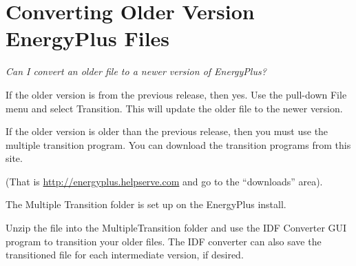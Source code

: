 \section{Converting Older Version EnergyPlus Files}\label{converting-older-version-energyplus-files}

\emph{Can I convert an older file to a newer version of EnergyPlus?}

If the older version is from the previous release, then yes. Use the pull-down File menu and select Transition. This will update the older file to the newer version.

If the older version is older than the previous release, then you must use the multiple transition program. You can download the transition programs from this site.

(That is \url{http://energyplus.helpserve.com} and go to the ``downloads'' area).

The Multiple Transition folder is set up on the EnergyPlus install.

Unzip the file into the MultipleTransition folder and use the IDF Converter GUI program to transition your older files. The IDF converter can also save the transitioned file for each intermediate version, if desired.
